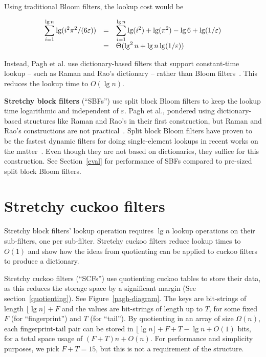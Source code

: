 \documentclass[letterpaper,twocolumn,10pt]{article}
\newcommand{\etal}{et al.}
\newcommand{\Taffy}{Stretchy}
\newcommand{\TBF}{SBF}
\newcommand{\TCF}{SCF}
\newcommand{\Taffy}{Taffy}
\newcommand{\TBF}{TBF}
\newcommand{\TCF}{TCF}
\begin{document}
Using traditional Bloom filters, the lookup cost would be

\[
\begin{array}{r c l}
\displaystyle\sum_{i=1}^{\lg n} \lg (i^2 \pi^2 /(6 \varepsilon)) & = &
 \displaystyle\sum_{i=1}^{\lg n} \lg (i^2) + \lg( \pi^2) - \lg 6 + \lg (1/\varepsilon) \\
& = & \Theta(\lg^2 n + \lg n \lg (1/\varepsilon))
\end{array}
\]

Instead, Pagh \etal{} use dictionary-based filters that support constant-time lookup -- such as Raman and Rao's dictionary -- rather than Bloom filters~\cite{succinct,psw}.
This reduces the lookup time to $O(\lg n)$.

{\bf \Taffy{} block filters} (``\TBF{}s'') use split block Bloom filters to keep the lookup time logarithmic and independent of $\varepsilon$.
Pagh \etal{}, pondered using dictionary-based structures like Raman and Rao's in their first construction, but Raman and Rao's constructions are not practical~\cite{psw,succinct}.
Split block Bloom filters have proven to be the fastest dynamic filters for doing single-element lookups in recent works on the matter~\cite{overtakes,ribbon,bloom-simd}.
Even though they are not based on dictionaries, they suffice for this construction.
See Section~\ref{eval} for performance of \TBF{}s compared to pre-sized split block Bloom filters.


\section{\Taffy{} cuckoo filters}
\label{tcf}

\Taffy{} block filters' lookup operation requires $\lg n$ lookup operations on their sub-filters, one per sub-filter.
\Taffy{} cuckoo filters reduce lookup times to $O(1)$ and show how the ideas from quotienting can be applied to cuckoo filters to produce a dictionary.

\Taffy{} cuckoo filters (``\TCF{}s'') use quotienting cuckoo tables %
to store their data, as this reduces the storage space by a significant margin (See section~\ref{quotienting}).
See Figure~\ref{pagh-diagram}.
The keys are bit-strings of length $\lfloor \lg n \rfloor + F$ and the values are bit-strings of length up to $T$, for some fixed $F$ (for ``fingerprint'') and $T$ (for ``tail'').
By quotienting in an array of size $\Omega(n)$, each fingerprint-tail pair can be stored in $\lfloor \lg n \rfloor + F + T - \lg n + O(1)$ bits, for a total space usage of $(F+T)n + O(n)$.
For performance and simplicity purposes, we pick $F + T = 15$, but this is not a requirement of the structure.
\end{document}
